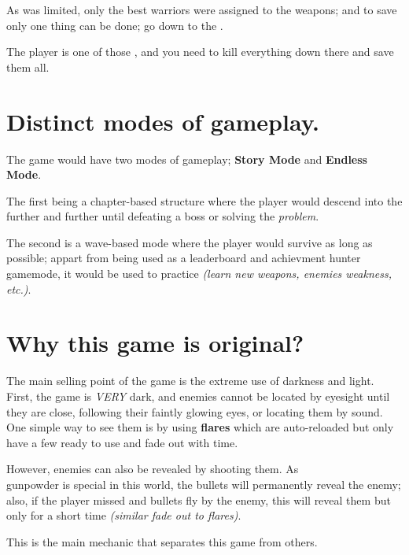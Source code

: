 As \gunpowder was limited, only the best warriors were assigned to the \gunpowder weapons; and to save \humanity only one thing can be done; go down to the \hole.

The player is one of those \hunters, and you need to kill everything down there and save them all.

\newpage


\section{Distinct modes of gameplay.}
The game would have two modes of gameplay; \textbf{Story Mode} and \textbf{Endless Mode}.

The first being a chapter-based structure where the player would descend into the \hole further and further until defeating a boss or solving the \hole \textit{problem}.

The second is a wave-based mode where the player would survive as long as possible; appart from being used as a leaderboard and achievment hunter gamemode, it would be used to practice \textit{(learn new weapons, enemies weakness, etc.)}.


\section{Why this game is original?}
The main selling point of the game is the extreme use of darkness and light. First, the game is \textit{VERY} dark, and enemies cannot be located by eyesight until they are close, following their faintly glowing eyes, or locating them by sound. One simple way to see them is by using \textbf{flares} which are auto-reloaded but only have a few ready to use and fade out with time.

However, enemies can also be revealed by shooting them. As \\gunpowder is special in this world, the bullets will permanently reveal the enemy; also, if the player missed and bullets fly by the enemy, this will reveal them but only for a short time \textit{(similar fade out to flares)}.

This is the main mechanic that separates this game from others.


